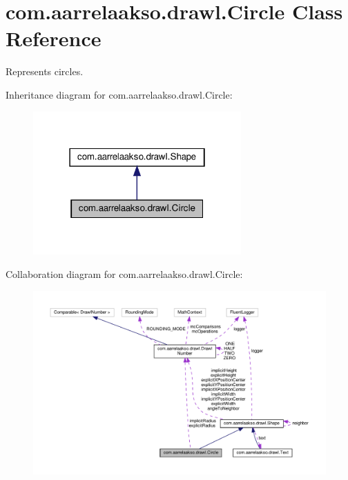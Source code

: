 \hypertarget{classcom_1_1aarrelaakso_1_1drawl_1_1_circle}{}\section{com.\+aarrelaakso.\+drawl.\+Circle Class Reference}
\label{classcom_1_1aarrelaakso_1_1drawl_1_1_circle}


Represents circles.  




Inheritance diagram for com.\+aarrelaakso.\+drawl.\+Circle\+:
\nopagebreak
\begin{figure}[H]
\begin{center}
\leavevmode
\includegraphics[width=226pt]{dd/d1c/classcom_1_1aarrelaakso_1_1drawl_1_1_circle__inherit__graph}
\end{center}
\end{figure}


Collaboration diagram for com.\+aarrelaakso.\+drawl.\+Circle\+:
\nopagebreak
\begin{figure}[H]
\begin{center}
\leavevmode
\includegraphics[width=350pt]{de/d25/classcom_1_1aarrelaakso_1_1drawl_1_1_circle__coll__graph}
\end{center}
\end{figure}
